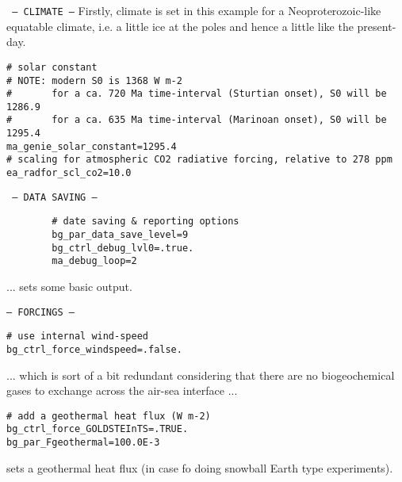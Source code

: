 \documentclass[10pt,twoside]{article}
\begin{document}
\begin{compactitem}

        \item \texttt{ --- CLIMATE ---}
        Firstly, climate is set in this example for a Neoproterozoic-like equatable climate, i.e. a little ice at the poles and hence a little like the present-day.
        \vspace{-5pt}\begin{verbatim}
# solar constant
# NOTE: modern S0 is 1368 W m-2
#       for a ca. 720 Ma time-interval (Sturtian onset), S0 will be 1286.9
#       for a ca. 635 Ma time-interval (Marinoan onset), S0 will be 1295.4
ma_genie_solar_constant=1295.4
# scaling for atmospheric CO2 radiative forcing, relative to 278 ppm
ea_radfor_scl_co2=10.0
                \end{verbatim}\vspace{-5pt}

        \item \texttt{ --- DATA SAVING ---}
        \vspace{-5pt}\begin{verbatim}
        # date saving & reporting options
        bg_par_data_save_level=9
        bg_ctrl_debug_lvl0=.true.
        ma_debug_loop=2
                \end{verbatim}\vspace{-5pt}
                ... sets some basic output.
                
                \item \texttt{--- FORCINGS ---}
                \vspace{-5pt}\begin{verbatim}
# use internal wind-speed
bg_ctrl_force_windspeed=.false.
                \end{verbatim}\vspace{-5pt}
                ... which is sort of a bit redundant considering that there are no biogeochemical gases to exchange across the air-sea interface ...
                \vspace{-5pt}\begin{verbatim}
# add a geothermal heat flux (W m-2)
bg_ctrl_force_GOLDSTEInTS=.TRUE.
bg_par_Fgeothermal=100.0E-3
                \end{verbatim}\vspace{-5pt}
                sets a geothermal heat flux (in case fo doing snowball Earth type experiments).

        \end{compactitem}
\end{document}
